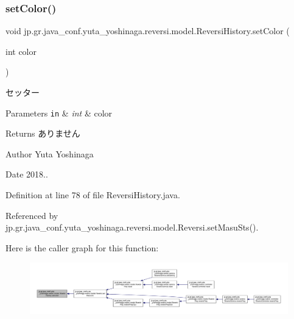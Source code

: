 \subsubsection{\texorpdfstring{set\+Color()}{setColor()}}
{\footnotesize\ttfamily void jp.\+gr.\+java\+\_\+conf.\+yuta\+\_\+yoshinaga.\+reversi.\+model.\+Reversi\+History.\+set\+Color (\begin{DoxyParamCaption}\item[{int}]{color }\end{DoxyParamCaption})}



セッター 


\begin{DoxyParams}[1]{Parameters}
\mbox{\tt in}  & {\em int} & color \\
\hline
\end{DoxyParams}
\begin{DoxyReturn}{Returns}
ありません 
\end{DoxyReturn}
\begin{DoxyAuthor}{Author}
Yuta Yoshinaga 
\end{DoxyAuthor}
\begin{DoxyDate}{Date}
2018.. 
\end{DoxyDate}


Definition at line 78 of file Reversi\+History.\+java.



Referenced by jp.\+gr.\+java\+\_\+conf.\+yuta\+\_\+yoshinaga.\+reversi.\+model.\+Reversi.\+set\+Masu\+Sts().

Here is the caller graph for this function\+:
\nopagebreak
\begin{figure}[H]
\begin{center}
\leavevmode
\includegraphics[width=350pt]{classjp_1_1gr_1_1java__conf_1_1yuta__yoshinaga_1_1reversi_1_1model_1_1_reversi_history_a8584f37692c128381951ddc55d551d59_icgraph}
\end{center}
\end{figure}
\mbox{\label{classjp_1_1gr_1_1java__conf_1_1yuta__yoshinaga_1_1reversi_1_1model_1_1_reversi_history_a328707ab9f3e9b711633ee65951ca89d}} 
